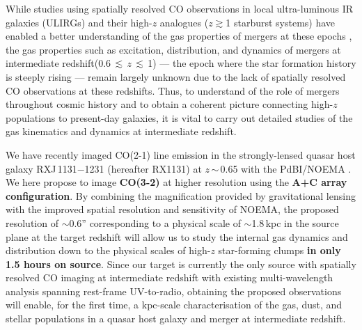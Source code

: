 \documentclass[11pt,a4paper,twoside,graphicx,color]{article}
\newcommand{\bco}{\mbox{CO(2-1)}\xspace}
\newcommand{\cco}{\mbox{CO(3-2)}\xspace}
\newcommand{\Fig}[1]{Fig.~\ref{fig:#1}}
\newcommand{\ssim}{\,$\sim$\,}
\newcommand{\mulw}{multi-wavelength\xspace}
\newcommand{\SF}{star formation\xspace}
\newcommand{\SB}{starburst\xspace}
\newcommand{\highz}{high-$z$\xspace}
\newcommand{\atinterz}{at intermediate redshift\xspace}
\newcommand{\obs}{observations\xspace}
\begin{document}
While studies using spatially resolved CO \obs in
local ultra-luminous IR galaxies (ULIRGs) and their \highz analogues ($z$$\gtrsim$1 \SB systems)
have enabled a better understanding of the gas properties of mergers at these epochs
\citep[e.g.][]{Carilli10a, Engel10a,Bothwell10a,Riechers11b, Ivison11a},
the gas properties such as excitation, distribution, and dynamics of mergers
\atinterz (0.6\,$\lesssim$\,$z$\,$\lesssim$\,1) --- the epoch where the \SF history is steeply rising --- remain largely unknown
due to the lack of spatially resolved CO observations at these redshifts.
Thus, to understand of the role of mergers throughout cosmic history and
to obtain a coherent picture connecting \highz populations to present-day galaxies,
it is vital to carry out detailed studies of the gas kinematics and dynamics \atinterz.

We have recently imaged \bco line emission
in the strongly-lensed quasar host galaxy
 RXJ\,1131$-$1231 (hereafter RX1131) at $z$\ssim0.65
with the PdBI/NOEMA \citep[\Fig{combine};][]{Leung16b}.
We here propose to image {\bf \cco}
at higher resolution using the {\bf A+C array configuration}.
By combining the magnification provided by gravitational lensing with the improved spatial resolution and sensitivity of NOEMA,
the proposed resolution of $\sim$0.6''
corresponding to a physical scale of $\sim$1.8\,kpc in the source plane at the target redshift
will allow us to study the internal gas dynamics and distribution
down to the physical scales of \highz star-forming clumps {\bf in only 1.5 hours on source}.
Since our target is currently the only source with spatially resolved CO
imaging at intermediate redshift with existing \mulw analysis spanning rest-frame
UV-to-radio, obtaining the proposed \obs will enable, for the first time, a kpc-scale characterisation of the gas, dust, and stellar populations in a quasar host galaxy and merger at intermediate redshift.
\end{document}
